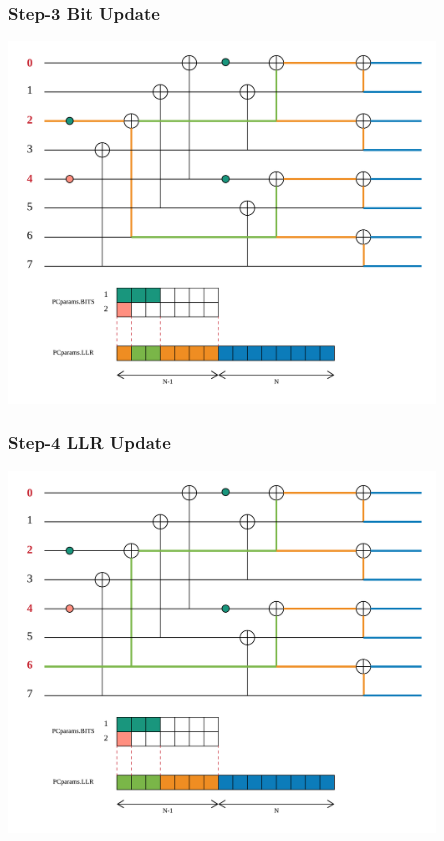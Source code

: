 \documentclass{beamer}
\begin{document}
\begin{frame}
\frametitle{Step-3 Bit Update}
  \begin{center}
  \includegraphics[width=0.85\textwidth]{pics/polar_-_SC_bit_3.png}
  \end{center}
\end{frame}

\begin{frame}
\frametitle{Step-4 LLR Update}
  \begin{center}
  \includegraphics[width=0.85\textwidth]{pics/polar_-_SC_llr_4.png}
  \end{center}
\end{frame}
\end{document}
